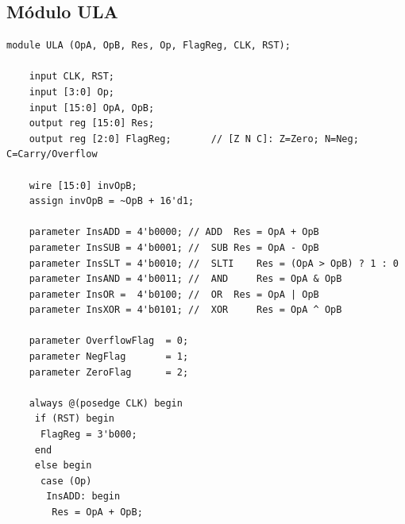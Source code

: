 \documentclass[11pt,a4paper,titlepage]{article}
\begin{document}
\begin{appendices}
	\chapter{Módulo ULA}
	\label{app:ULA}
	\begin{lstlisting}[style={verilog-style}]
module ULA (OpA, OpB, Res, Op, FlagReg, CLK, RST);

	input CLK, RST;
	input [3:0] Op;
	input [15:0] OpA, OpB;
	output reg [15:0] Res;
	output reg [2:0] FlagReg;		// [Z N C]: Z=Zero; N=Neg; C=Carry/Overflow
	
	wire [15:0] invOpB;
	assign invOpB = ~OpB + 16'd1;

	parameter InsADD = 4'b0000;	// ADD	Res = OpA + OpB
	parameter InsSUB = 4'b0001;	//	SUB	Res = OpA - OpB
	parameter InsSLT = 4'b0010;	//	SLTI	Res = (OpA > OpB) ? 1 : 0
	parameter InsAND = 4'b0011;	//	AND 	Res = OpA & OpB
	parameter InsOR =  4'b0100;	//	OR 	Res = OpA | OpB
	parameter InsXOR = 4'b0101;	//	XOR 	Res = OpA ^ OpB
	
	parameter OverflowFlag	= 0;
	parameter NegFlag 		= 1;
	parameter ZeroFlag		= 2;
	
	always @(posedge CLK) begin
	 if (RST) begin
	  FlagReg = 3'b000;
	 end
	 else begin
	  case (Op)
	   InsADD: begin			
	    Res = OpA + OpB;
					

\end{lstlisting}
\end{appendices}
\end{document}
